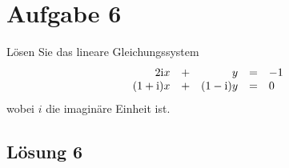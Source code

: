 \documentclass[main.tex]{subfiles}
\begin{document}
\section{Aufgabe 6}
Lösen Sie das lineare Gleichungssystem
$$
    \begin{array}{rcrcl}
        2\mathrm{i}x &+ & y &= & -1 \\
        (1+\mathrm{i})x &+ & (1-\mathrm{i})y &= & 0\\
    \end{array}
$$
wobei $i$ die imaginäre Einheit ist.

\subsection{Lösung 6}
\end{document}
